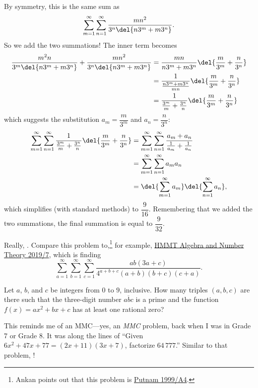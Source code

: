 \documentclass[11pt,paper=letter]{scrartcl}
\begin{document}
By symmetry, this is the same sum as $$\sum_{m=1}^{\infty} \sum_{n=1}^{\infty} \frac{mn^2}{3^n \del{n3^m + m3^n}}.$$ So we add the two summations! The inner term becomes
\begin{align*}
  \frac{m^2n}{3^m \del{n3^m + m3^n}} + \frac{mn^2}{3^n \del{n3^m + m3^n}} &= \frac{mn}{n3^m + m3^n}\del{\frac{m}{3^m} + \frac{n}{3^n}} \\
  &= \frac{1}{\frac{n3^m + m3^n}{mn}}\del{\frac{m}{3^m} + \frac{n}{3^n}} \\
  &= \frac{1}{\frac{3^m}{m} + \frac{3^n}{n}}\del{\frac{m}{3^m} + \frac{n}{3^n}}
\end{align*}
which suggests the substitution $a_m = \dfrac{m}{3^m}$ and $a_n = \dfrac{n}{3^n}$:
\begin{align*}
  \sum_{m=1}^{\infty} \sum_{n=1}^{\infty} \frac{1}{\frac{3^m}{m} + \frac{3^n}{n}}\del{\frac{m}{3^m} + \frac{n}{3^n}} &= \sum_{m=1}^{\infty} \sum_{n=1}^{\infty} \frac{a_m+a_n}{\frac{1}{a_m} + \frac{1}{a_n}} \\
  &= \sum_{m=1}^{\infty} \sum_{n=1}^{\infty} a_ma_n \\
  &= \del{\sum_{m=1}^{\infty} a_m}\del{\sum_{n=1}^{\infty} a_n},
\end{align*}
which simplifies (with standard methods) to $\dfrac9{16}$. Remembering that we added the two summations, the final summation is equal to $\dfrac9{32}$.

Really, . Compare this problem to,\footnote{Ankan points out that this problem is \href{https://artofproblemsolving.com/community/c7h513428p2882541}{Putnam 1999/A4}.} for example, \href{https://s3.amazonaws.com/hmmt-archive/february/2019/HMMTFebruary2019AlgebraandNumberTheoryTest.pdf}{HMMT Algebra and Number Theory 2019/7}, which is finding
$$\sum_{a=1}^{\infty}\sum_{b=1}^{\infty}\sum_{c=1}^{\infty} \frac{ab(3a+c)}{4^{a+b+c}(a+b)(b+c)(c+a)}.$$

\begin{probboxed}
   Let $a$, $b$, and $c$ be integers from $0$ to $9$, inclusive. How many triples $(a, b, c)$ are there such that the three-digit number $\overline{abc}$ is a prime and the function $f(x) = ax^2 + bx + c$ has at least one rational zero?
\end{probboxed}

This reminds me of an MMC---yes, an \emph{MMC} problem, back when I was in Grade 7 or Grade 8. It was along the lines of ``Given $6x^2 + 47x + 77 = (2x + 11)(3x + 7)$, factorize $64\,777$.'' Similar to that problem, !
\end{document}
